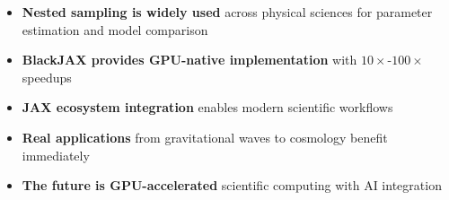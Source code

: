 \documentclass[aspectratio=169]{beamer}
\begin{document}
\begin{frame}
    \begin{itemize}
        \item \textbf{Nested sampling is widely used} across physical sciences for parameter estimation and model comparison
        \item \textbf{BlackJAX provides GPU-native implementation} with $10\times$-$100\times$ speedups
        \item \textbf{JAX ecosystem integration} enables modern scientific workflows
        \item \textbf{Real applications} from gravitational waves to cosmology benefit immediately
        \item \textbf{The future is GPU-accelerated} scientific computing with AI integration
    \end{itemize}
\end{frame}
\end{document}
